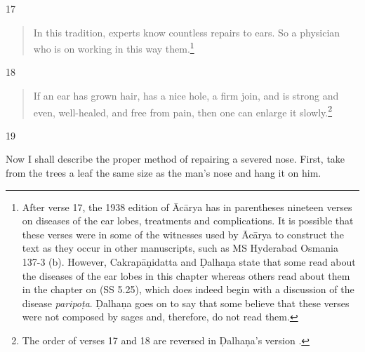 \begin{translation}
    \item[17]
          \begin{verse}
    In this tradition, experts know countless repairs to ears.  So a 
    physician who is  on working in this way 
     them.\footnote{After verse 17, the 1938 edition of Ācārya \citep[80]{vulgate} has in parentheses nineteen verses on diseases of the ear lobes, treatments and complications. It is possible that these verses were in some of the witnesses used by Ācārya to construct the text as they occur in other manuscripts, such as  MS Hyderabad Osmania 137-3 (b). However, Cakrapāṇidatta \citep[132]{acar-1939} and Ḍalhaṇa \citep[80]{vulgate} state that some read about the diseases of the ear lobes in this chapter whereas others read about them in the chapter on  (SS 5.25), which does indeed begin with a discussion of the disease \emph{paripoṭa}.  Ḍalhaṇa goes on to say that some believe that these verses were not composed by sages and, therefore, do not read them.}
        \end{verse}
    
    \item[18]
           \begin{verse}
    If an ear has grown hair, has a nice hole, a firm join, and is strong and
    even, well-healed, and free from pain, then one can enlarge it slowly.\footnote{The order of verses 17 and 18 are reversed in Ḍalhaṇa's version \citep[80]{vulgate}.}
        \end{verse}
    
    \item[19]
    
    Now I shall describe the proper method of repairing a severed nose.
    First, take from the trees a leaf the same size as the man's nose and hang it
    on him. 
    

\end{translation}
